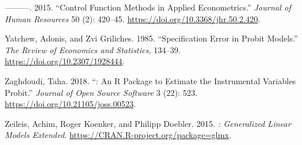 \begin{CSLReferences}{1}{0}
\leavevmode{}%
---------. 2015. {``{Control Function Methods in Applied Econometrics}.''} \emph{Journal of Human Resources} 50 (2): 420--45. \url{https://doi.org/10.3368/jhr.50.2.420}.

\leavevmode{}%
Yatchew, Adonis, and Zvi Griliches. 1985. {``{Specification Error in Probit Models}.''} \emph{The Review of Economics and Statistics}, 134--39. \url{https://doi.org/10.2307/1928444}.

\leavevmode{}%
Zaghdoudi, Taha. 2018. {``: An {R} Package to Estimate the Instrumental Variables Probit.''} \emph{Journal of Open Source Software} 3 (22): 523. \url{https://doi.org/10.21105/joss.00523}.

\leavevmode{}%
Zeileis, Achim, Roger Koenker, and Philipp Doebler. 2015. \emph{{: Generalized Linear Models Extended}}. \url{https://CRAN.R-project.org/package=glmx}.

\end{CSLReferences}



\address{%
Mauricio Sarrias\\
Universidad de Talca\\%
Facultad de Economía y Negocios (FEN)\\ Universidad de Talca, Talca, Chile\\
%
\url{https://www.msarrias.com}\\%
\textit{ORCiD: \href{https://orcid.org/0000-0001-5932-4817}{0000-0001-5932-4817}}\\%
\href{mailto:mauricio.sarrias@utalca.cl}{\nolinkurl{mauricio.sarrias@utalca.cl}}%
}
